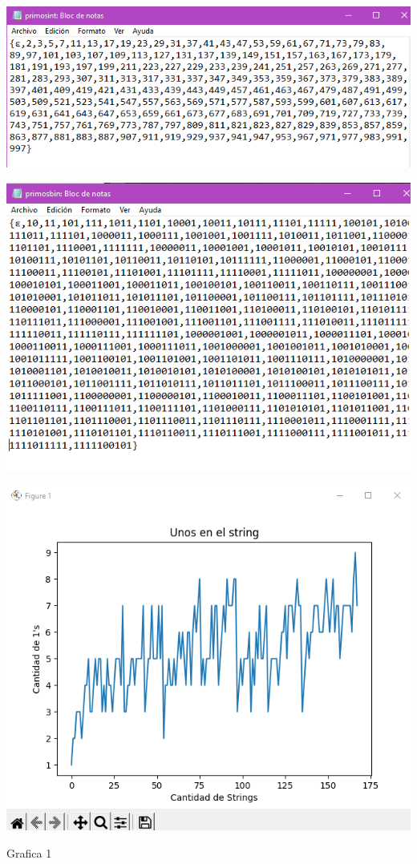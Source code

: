 \documentclass{article}
\begin{document}
\begin{center}
    \includegraphics[scale = 0.7]{primostest2.png}
\end{center}

\begin{center}
    \includegraphics[scale = 1.5]{primostest3.PNG}
\end{center}

\begin{center}
    \includegraphics[scale = 0.7]{Grafica.png}
    \caption{Grafica 1}
\end{center}
\end{document}
